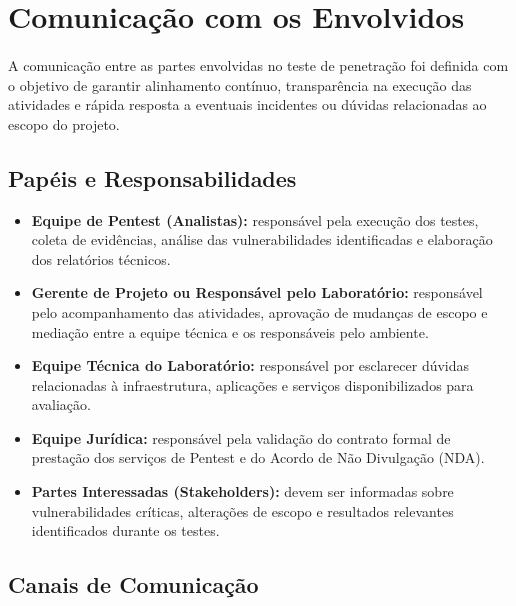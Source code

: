 \section{Comunicação com os Envolvidos}

\paragraph{}
A comunicação entre as partes envolvidas no teste de penetração foi definida
com o objetivo de garantir alinhamento contínuo, transparência na execução das
atividades e rápida resposta a eventuais incidentes ou dúvidas relacionadas ao
escopo do projeto.

\subsection{Papéis e Responsabilidades}

\begin{itemize}
\item \textbf{Equipe de Pentest (Analistas):}
responsável pela execução dos testes, coleta de evidências, análise das
vulnerabilidades identificadas e elaboração dos relatórios técnicos.

\item \textbf{Gerente de Projeto ou Responsável pelo Laboratório:}
responsável pelo acompanhamento das atividades, aprovação de mudanças de escopo
e mediação entre a equipe técnica e os responsáveis pelo ambiente.

\item \textbf{Equipe Técnica do Laboratório:}
responsável por esclarecer dúvidas relacionadas à infraestrutura, aplicações e
serviços disponibilizados para avaliação.

\item \textbf{Equipe Jurídica:}
responsável pela validação do contrato formal de prestação dos serviços de
Pentest e do Acordo de Não Divulgação (NDA).

\item \textbf{Partes Interessadas (Stakeholders):}
devem ser informadas sobre vulnerabilidades críticas, alterações de escopo e
resultados relevantes identificados durante os testes.

\end{itemize}

\subsection{Canais de Comunicação}


